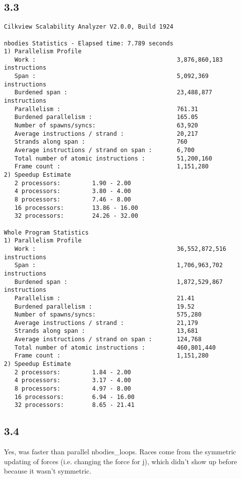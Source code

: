 \documentclass[12pt]{article}
\begin{document}
\subsection{3.3}
\begin{verbatim}
Cilkview Scalability Analyzer V2.0.0, Build 1924

nbodies Statistics - Elapsed time: 7.789 seconds
1) Parallelism Profile
   Work :                                        3,876,860,183 instructions
   Span :                                        5,092,369 instructions
   Burdened span :                               23,488,877 instructions
   Parallelism :                                 761.31
   Burdened parallelism :                        165.05
   Number of spawns/syncs:                       63,920
   Average instructions / strand :               20,217
   Strands along span :                          760
   Average instructions / strand on span :       6,700
   Total number of atomic instructions :         51,200,160
   Frame count :                                 1,151,280
2) Speedup Estimate
   2 processors:         1.90 - 2.00
   4 processors:         3.80 - 4.00
   8 processors:         7.46 - 8.00
   16 processors:        13.86 - 16.00
   32 processors:        24.26 - 32.00

Whole Program Statistics
1) Parallelism Profile
   Work :                                        36,552,872,516 instructions
   Span :                                        1,706,963,702 instructions
   Burdened span :                               1,872,529,867 instructions
   Parallelism :                                 21.41
   Burdened parallelism :                        19.52
   Number of spawns/syncs:                       575,280
   Average instructions / strand :               21,179
   Strands along span :                          13,681
   Average instructions / strand on span :       124,768
   Total number of atomic instructions :         460,801,440
   Frame count :                                 1,151,280
2) Speedup Estimate
   2 processors:         1.84 - 2.00
   4 processors:         3.17 - 4.00
   8 processors:         4.97 - 8.00
   16 processors:        6.94 - 16.00
   32 processors:        8.65 - 21.41
\end{verbatim}

\subsection{3.4}
Yes, was faster than parallel nbodies\_loops.  
Races come from the symmetric updating of forces (i.e. changing the force for j), 
which didn't show up before because it wasn't symmetric.  
\end{document}
